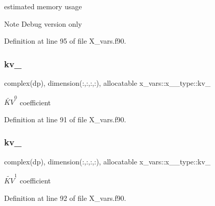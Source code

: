 estimated memory usage 

\begin{DoxyNote}{Note}
Debug version only 
\end{DoxyNote}


Definition at line 95 of file X\+\_\+vars.\+f90.

\mbox{\label{structx__vars_1_1x__2__type_ae7427dad704bb989266d32d97e5d0235}} 
\subsubsection{\texorpdfstring{kv\+\_}{kv\_0}}
{\footnotesize\ttfamily complex(dp), dimension(\+:,\+:,\+:,\+:), allocatable x\+\_\+vars\+::x\+\_\+\_\+type\+::kv\+\_}



$\widetilde{KV}^0$ coefficient 



Definition at line 91 of file X\+\_\+vars.\+f90.

\mbox{\label{structx__vars_1_1x__2__type_a0cad62f1816e668211135c7097916123}} 
\subsubsection{\texorpdfstring{kv\+\_}{kv\_1}}
{\footnotesize\ttfamily complex(dp), dimension(\+:,\+:,\+:,\+:), allocatable x\+\_\+vars\+::x\+\_\+\_\+type\+::kv\+\_}



$\widetilde{KV}^1$ coefficient 



Definition at line 92 of file X\+\_\+vars.\+f90.

\mbox{\label{structx__vars_1_1x__2__type_a7861681a8170e07ce68ae6d29af2f3d3}} 

